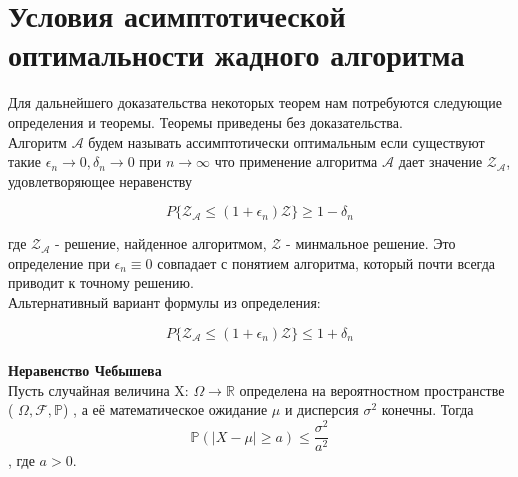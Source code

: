 \documentclass[a4paper, 14pt]{extarticle}
\numberwithin{equation}{section}
\begin{document}
\newcommand{\algorithm}{$\mathcal{A'}$}
\newcommand{\topboundE}{$\mathcal{Z^*_{A'}}$}
\newcommand{\topboundD}{$\mathcal{D^*_{A'}}$}
\newcommand{\randomvalue}{$\mathcal{Z_{A'}}$}
\newcommand{\randomvalueE}{$E(\text{\randomvalue})$}
\newcommand{\randomvalueD}{$D(\text{\randomvalue})$}

\section{Условия асимптотической оптимальности жадного алгоритма}

Для дальнейшего доказательства некоторых теорем нам потребуются следующие определения и теоремы. Теоремы приведены без доказательства.\\


Алгоритм $\mathcal{A}$ будем называть ассимптотически оптимальным если существуют такие $\epsilon_n \rightarrow 0, \delta_n \rightarrow 0$ при $n \rightarrow \infty$ что применение алгоритма $\mathcal{A}$ дает значение  $\mathcal{Z_A}$, удовлетворяющее неравенству
 
\begin{equation}\label{1}
P\{\mathcal{Z_A} \leq (1+\epsilon_n)\mathcal{Z}\}\geq 1-\delta_n
\end{equation}

где $\mathcal{Z_A}$ - решение, найденное алгоритмом, $\mathcal{Z}$ - минмальное решение.
Это определение при $\epsilon_n \equiv 0$ совпадает с понятием алгоритма, который почти всегда приводит к точному решению. \\

Альтернативный вариант формулы из определения:

\begin{equation}
P\{\mathcal{Z_A} \leq (1+\epsilon_n)\mathcal{Z}\}\leq 1+\delta_n
\end{equation} \\


\textbf{Неравенство Чебышева} \\

Пусть случайная величина X: $\Omega\rightarrow\mathbb {R}$ определена на вероятностном пространстве ( $\Omega,{\mathcal {F}},\mathbb {P} $)
, а её математическое ожидание $\mu$ и дисперсия  $\sigma ^{2}$ конечны. Тогда 
\begin{equation}
{\mathbb {P}}\left(|X-\mu |\geqslant a\right)\leqslant {\frac {\sigma ^{2}}{a^{2}}}
\end{equation},
где  $a>0$. \\ \\
\end{document}
